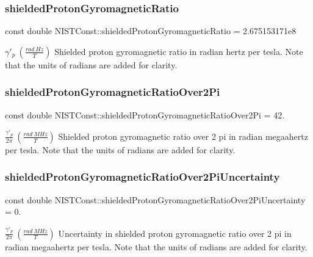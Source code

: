 \subsubsection{\texorpdfstring{shielded\+Proton\+Gyromagnetic\+Ratio}{shieldedProtonGyromagneticRatio}}
{\footnotesize\ttfamily const double N\+I\+S\+T\+Const\+::shielded\+Proton\+Gyromagnetic\+Ratio = 2.\+675153171e8}

$\gamma'_p \ (\frac{rad\ Hz}{T})$ Shielded proton gyromagnetic ratio in radian hertz per tesla. Note that the units of radians are added for clarity. \mbox{\label{group___proton_ga5b2d223ede8fc141af04cef0486c2c52}} 
\subsubsection{\texorpdfstring{shielded\+Proton\+Gyromagnetic\+Ratio\+Over2\+Pi}{shieldedProtonGyromagneticRatioOver2Pi}}
{\footnotesize\ttfamily const double N\+I\+S\+T\+Const\+::shielded\+Proton\+Gyromagnetic\+Ratio\+Over2\+Pi = 42.}

$\frac{\gamma'_p}{2 \pi} \ (\frac{rad\ MHz}{T})$ Shielded proton gyromagnetic ratio over 2 pi in radian megaahertz per tesla. Note that the units of radians are added for clarity. \mbox{\label{group___proton_ga8a726ae1ce4a083a50cd2bb5c446cf15}} 
\subsubsection{\texorpdfstring{shielded\+Proton\+Gyromagnetic\+Ratio\+Over2\+Pi\+Uncertainty}{shieldedProtonGyromagneticRatioOver2PiUncertainty}}
{\footnotesize\ttfamily const double N\+I\+S\+T\+Const\+::shielded\+Proton\+Gyromagnetic\+Ratio\+Over2\+Pi\+Uncertainty = 0.}

$\frac{\gamma'_p}{2 \pi} \ (\frac{rad\ MHz}{T})$ Uncertainty in shielded proton gyromagnetic ratio over 2 pi in radian megaahertz per tesla. Note that the units of radians are added for clarity. \mbox{\label{group___proton_gae603375639410bab3920a82ad88e22b8}} 
